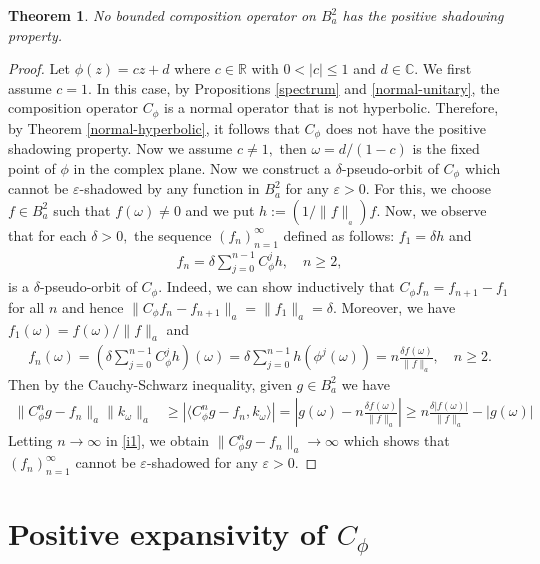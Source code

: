 \documentclass[11pt]{amsart}%
\numberwithin{equation}{section}
\theoremstyle{plain}
\newtheorem{thm}{Theorem}[section]
\theoremstyle{definition}
\theoremstyle{definition}
\begin{document}
\begin{thm}\label{shadowing} No bounded composition operator on $B^2_a$ has the positive shadowing property.  
\end{thm}

\begin{proof}  Let $\phi(z)=cz+d$ where $c\in \mathbb{R}$ with $0<|c|\leq 1$ and $d\in \mathbb{C}.$ We first assume $c=1.$ In this case, by Propositions \ref{spectrum} and \ref{normal-unitary}, the composition operator $C_{\phi}$  is a normal operator that is not hyperbolic. Therefore, by Theorem \ref{normal-hyperbolic}, it follows that $C_{\phi}$ does not have the positive shadowing property. Now we assume $c\neq 1,$ then $\omega=d/(1-c)$ is the fixed point of $\phi$ in the complex plane.
Now we construct a $\delta$-pseudo-orbit of $C_{\phi}$ which cannot be $\varepsilon$-shadowed by any function in $B^2_a$ for any $\varepsilon>0.$ For this, we choose $f\in B^2_a$ such that $f(\omega)\neq 0$ and we put $h:=(1/\|f\|_{_a})f.$ Now, we observe that for each $\delta>0,$ the sequence $(f_n)_{n=1}^{\infty}$ defined as follows: $f_1=\delta h$ and
\begin{align*}
f_n=\delta\sum_{j=0}^{n-1}C_{\phi}^{j}h, \quad n\geq 2,
\end{align*}
is a $\delta$-pseudo-orbit of $C_{\phi}.$ Indeed, we can show inductively that $C_{\phi}f_n=f_{n+1}-f_1$ for all $n$ and hence $\|C_{\phi}f_n-f_{n+1}\|_a=\|f_1\|_a=\delta.$ Moreover, we have $f_1(\omega)=f(\omega)/\|f\|_a$ and 
\begin{align*}
f_n(\omega)=(\delta\sum_{j=0}^{n-1}C_{\phi}^{j}h)(\omega)=\delta\sum_{j=0}^{n-1}h(\phi^j(\omega))=n\frac{\delta f(\omega)}{\|f\|_a}, \quad n\geq2.
\end{align*}
Then by the Cauchy-Schwarz inequality, given $g\in B^2_a$ we have
\begin{align}\label{i1}
\|C_{\phi}^ng-f_n\|_{a}\|k_{\omega}\|_{a}&\geq |\langle C_{\phi}^ng-f_n,k_{\omega}\rangle|=|g(\omega)-n\frac{\delta f(\omega)}{\|f\|_{a}}|\geq n\frac{\delta| f(\omega)|}{\|f\|_{a}}-|g(\omega)|
\end{align}
 Letting $n\rightarrow \infty$ in \eqref{i1}, we obtain $\|C_{\phi}^ng-f_n\|_{a}\rightarrow \infty$ which shows that $(f_n)_{n=1}^{\infty}$ cannot be $\varepsilon$-shadowed for any $\varepsilon>0.$
\end{proof}
\section{Positive expansivity of \texorpdfstring{$C_{\phi}$}{}} 
\end{document}
